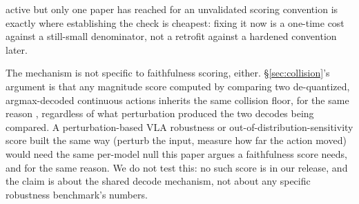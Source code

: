 \documentclass{article}
\begin{document}
active but only one paper has reached for an unvalidated scoring convention is exactly where establishing the check is cheapest: fixing it now is a one-time cost against a still-small denominator, not a retrofit against a hardened convention later.

The mechanism is not specific to faithfulness scoring, either. \S\ref{sec:collision}'s argument is that any magnitude score computed by comparing two de-quantized, argmax-decoded continuous actions inherits the same collision floor, for the same reason \citep{fast2025}, regardless of what perturbation produced the two decodes being compared. A perturbation-based VLA robustness or out-of-distribution-sensitivity score built the same way (perturb the input, measure how far the action moved) would need the same per-model null this paper argues a faithfulness score needs, and for the same reason. We do not test this: no such score is in our release, and the claim is about the shared decode mechanism, not about any specific robustness benchmark's numbers.


\end{document}
